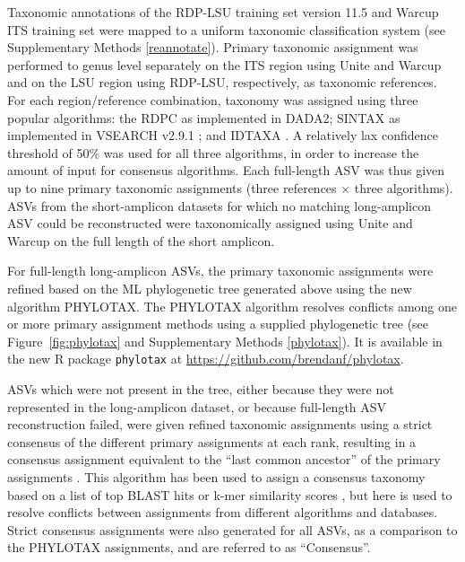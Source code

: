 \documentclass[
  12pt,
]{article}
\begin{document}
Taxonomic annotations of the RDP-LSU training set version 11.5 \autocite{liu2012,cole2014} and Warcup ITS training set \autocite{deshpande2016} were mapped to a uniform taxonomic classification system (see Supplementary Methods \ref{reannotate}).
Primary taxonomic assignment was performed to genus level separately on the ITS region using Unite and Warcup and on the LSU region using RDP-LSU, respectively, as taxonomic references.
For each region/reference combination, taxonomy was assigned using three popular algorithms:
the RDPC \autocite{wang2007} as implemented in DADA2;
SINTAX \autocite{edgar2016a} as implemented in VSEARCH v2.9.1 \autocite{rognes2016};
and IDTAXA \autocite{murali2018}.
A relatively lax confidence threshold of 50\% was used for all three algorithms, in order to increase the amount of input for consensus algorithms.
Each full-length ASV was thus given up to nine primary taxonomic assignments (three references \(\times\) three algorithms).
ASVs from the short-amplicon datasets for which no matching long-amplicon ASV could be reconstructed were taxonomically assigned using Unite and Warcup on the full length of the short amplicon.

For full-length long-amplicon ASVs, the primary taxonomic assignments were refined based on the ML phylogenetic tree generated above using the new algorithm PHYLOTAX.
The PHYLOTAX algorithm resolves conflicts among one or more primary assignment methods using a supplied phylogenetic tree (see Figure~\ref{fig:phylotax} and Supplementary Methods \ref{phylotax}).
It is available in the new R package \texttt{phylotax} at \url{https://github.com/brendanf/phylotax}.

ASVs which were not present in the tree, either because they were not represented in the long-amplicon dataset, or because full-length ASV reconstruction failed, were given refined taxonomic assignments using a strict consensus of the different primary assignments at each rank, resulting in a consensus assignment equivalent to the ``last common ancestor'' of the primary assignments \autocite{huson2007}.
This algorithm has been used to assign a consensus taxonomy based on a list of top BLAST hits \autocites[e.g., MEGAN and LCAClassifier,][]{huson2016,lanzen2012} or k-mer similarity scores \autocite[mothur's k-nearest neighbor method,][]{schloss2009}, but here is used to resolve conflicts between assignments from different algorithms and databases.
Strict consensus assignments were also generated for all ASVs, as a comparison to the PHYLOTAX assignments, and are referred to as ``Consensus''.
\end{document}
